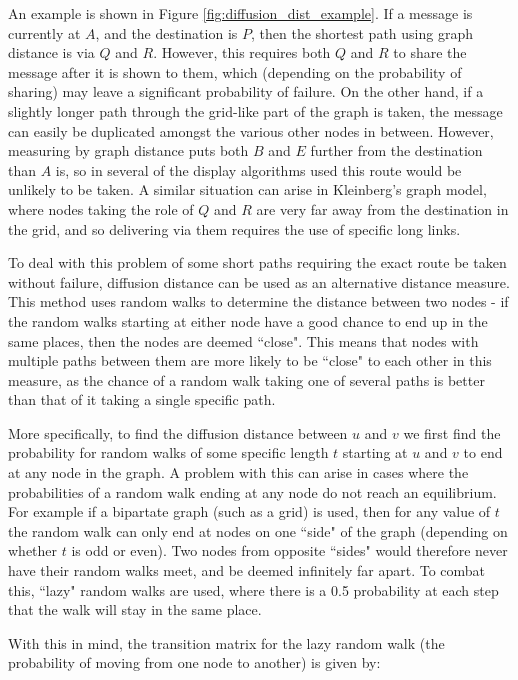 \documentclass[bsc,frontabs,twoside,singlespacing,parskip,deptreport]{infthesis}     %
\begin{document}
An example is shown in Figure \ref{fig:diffusion_dist_example}. If a message is currently at $A$, and the destination is $P$, then the shortest path using graph distance is via $Q$ and $R$. However, this requires both $Q$ and $R$ to share the message after it is shown to them, which (depending on the probability of sharing) may leave a significant probability of failure. On the other hand, if a slightly longer path through the grid-like part of the graph is taken, the message can easily be duplicated amongst the various other nodes in between. However, measuring by graph distance puts both $B$ and $E$ further from the destination than $A$ is, so in several of the display algorithms used this route would be unlikely to be taken. A similar situation can arise in Kleinberg's graph model, where nodes taking the role of $Q$ and $R$ are very far away from the destination in the grid, and so delivering via them requires the use of specific long links.

To deal with this problem of some short paths requiring the exact route be taken without failure, diffusion distance can be used as an alternative distance measure. This method uses random walks to determine the distance between two nodes - if the random walks starting at either node have a good chance to end up in the same places, then the nodes are deemed ``close". This means that nodes with multiple paths between them are more likely to be ``close" to each other in this measure, as the chance of a random walk taking one of several paths is better than that of it taking a single specific path.

More specifically, to find the diffusion distance between $u$ and $v$ we first find the probability for random walks of some specific length $t$ starting at $u$ and $v$ to end at any node in the graph. A problem with this can arise in cases where the probabilities of a random walk ending at any node do not reach an equilibrium. For example if a bipartate graph (such as a grid) is used, then for any value of $t$ the random walk can only end at nodes on one ``side" of the graph (depending on whether $t$ is odd or even). Two nodes from opposite ``sides" would therefore never have their random walks meet, and be deemed infinitely far apart. To combat this, ``lazy" random walks are used, where there is a 0.5 probability at each step that the walk will stay in the same place.

With this in mind, the transition matrix for the lazy random walk (the probability of moving from one node to another) is given by:
\end{document}
